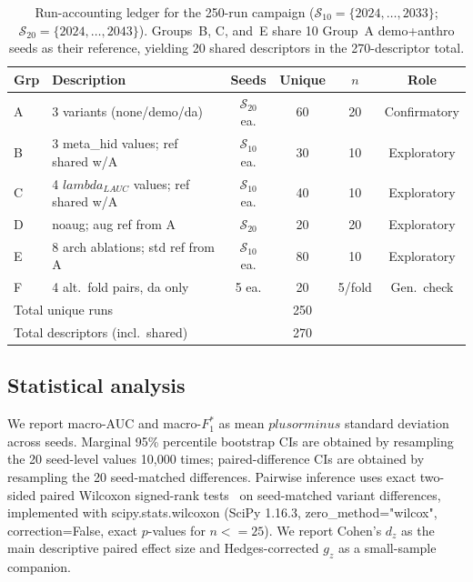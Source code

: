 \documentclass[mathematics,article,submit,pdftex]{Definitions/mdpi}
\def\texttt#1{#1}%
\def\mathrm#1{#1}%
\def\textbf#1{#1}%
\def\pm{plus or minus }%
\def\lambda{lambda }%
\def\leq{<=}%
\begin{document}
\begin{table}[H]
\caption{Run-accounting ledger for the 250-run campaign ($\mathcal{S}_{10}{=}\{2024,\ldots,2033\}$; $\mathcal{S}_{20}{=}\{2024,\ldots,2043\}$). Groups~B, C, and~E share 10 Group~A \texttt{demo+anthro} seeds as their reference, yielding 20 shared descriptors in the 270-descriptor total.}\label{tab:run_ledger}
\small\centering
\begin{tabular}{llcccc}
\toprule
\textbf{Grp} & \textbf{Description} & \textbf{Seeds} & \textbf{Unique} & \textbf{$n$} & \textbf{Role} \\
\midrule
A & 3 variants (none/demo/da) & $\mathcal{S}_{20}$ ea. & 60 & 20 & Confirmatory \\
B & 3 meta\_hid values; ref shared w/A & $\mathcal{S}_{10}$ ea. & 30 & 10 & Exploratory \\
C & 4 $\lambda_{\mathrm{LAUC}}$ values; ref shared w/A & $\mathcal{S}_{10}$ ea. & 40 & 10 & Exploratory \\
D & noaug; aug ref from A & $\mathcal{S}_{20}$ & 20 & 20 & Exploratory \\
E & 8 arch ablations; std ref from A & $\mathcal{S}_{10}$ ea. & 80 & 10 & Exploratory \\
F & 4 alt.\ fold pairs, \texttt{da} only & 5 ea. & 20 & 5/fold & Gen.\ check \\
\midrule
\multicolumn{3}{l}{\textbf{Total unique runs}} & \textbf{250} & & \\
\multicolumn{3}{l}{\textbf{Total descriptors (incl.\ shared)}} & \textbf{270} & & \\
\bottomrule
\end{tabular}
\end{table}

\subsection{Statistical analysis}
We report macro-AUC and macro-$F_1^{\ast}$ as mean $\pm$ standard deviation across seeds. Marginal 95\% percentile bootstrap CIs are obtained by resampling the 20 seed-level values 10{,}000 times; paired-difference CIs are obtained by resampling the 20 seed-matched differences. Pairwise inference uses exact two-sided paired Wilcoxon signed-rank tests~\cite{Hollander2014} on seed-matched variant differences, implemented with \texttt{scipy.stats.wilcoxon} (SciPy 1.16.3, \texttt{zero\_method="wilcox"}, \texttt{correction=False}, exact $p$-values for $n{\leq}25$). We report Cohen's $d_{\mathrm{z}}$ as the main descriptive paired effect size and Hedges-corrected $g_{\mathrm{z}}$ as a small-sample companion.
\end{document}
